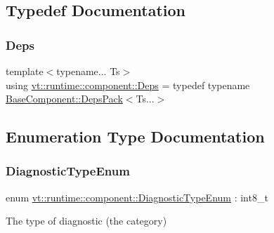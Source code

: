 \subsection{Typedef Documentation}
\mbox{\label{namespacevt_1_1runtime_1_1component_afad3a7a92e35d9ab3d81540d9275213c}} 
\subsubsection{\texorpdfstring{Deps}{Deps}}
{\footnotesize\ttfamily template$<$typename... Ts$>$ \\
using \hyperlink{namespacevt_1_1runtime_1_1component_afad3a7a92e35d9ab3d81540d9275213c}{vt\+::runtime\+::component\+::\+Deps} = typedef typename \hyperlink{structvt_1_1runtime_1_1component_1_1_base_component_1_1_deps_pack}{Base\+Component\+::\+Deps\+Pack}$<$Ts...$>$}



\subsection{Enumeration Type Documentation}
\mbox{\label{namespacevt_1_1runtime_1_1component_af0bb99d9a054682217874bdc735ecac0}} 
\subsubsection{\texorpdfstring{Diagnostic\+Type\+Enum}{DiagnosticTypeEnum}}
{\footnotesize\ttfamily enum \hyperlink{namespacevt_1_1runtime_1_1component_af0bb99d9a054682217874bdc735ecac0}{vt\+::runtime\+::component\+::\+Diagnostic\+Type\+Enum} \+: int8\+\_\+t\hspace{0.3cm}{\ttfamily [strong]}}



The type of diagnostic (the category) 

